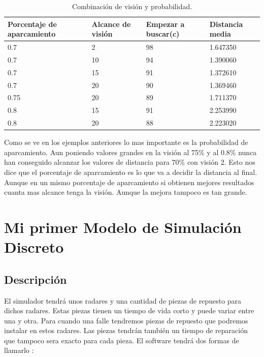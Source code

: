\documentclass[]{article}
\begin{document}
 \begin{table}[H]
	\begin{center}
		\resizebox{12.5cm}{!} {
			\begin{tabular}{|l|l|l|l|}
				\hline
				Porcentaje de aparcamiento & Alcance de visión & Empezar a buscar(c) & Distancia media \\
				\hline \hline
				0.7 & 2 & 98 & 1.647350
				\\ \hline
				0.7 & 10 & 94 & 1.390060
				\\ \hline
				0.7 & 15 & 91 & 1.372610
				\\ \hline
				0.7 & 20 & 90 & 1.369460
				\\ \hline
				0.75 & 20 & 89 & 1.711370
				\\ \hline
				0.8 & 15 & 91 & 2.253990	
				\\ \hline
				0.8 & 20 & 88&2.223020
				\\ \hline
			\end{tabular}
		}
		\caption{Combinación de visión y probabilidad.}
		\label{tabla:sencilla}
	\end{center}
\end{table}

Como se ve en los ejemplos anteriores lo mas importante es la probabilidad de aparcamiento. Aun poniendo valores grandes en la visión al 75\% y al 0.8\% nunca han conseguido alcanzar los valores de distancia para 70\% con visión 2. Esto nos dice que el porcentaje de aparcamiento es lo que va a decidir la distancia al final. Aunque en un mismo porcentaje de aparcamiento si obtienen mejores resultados cuanta mas alcance tenga la visión. Aunque la mejora tampoco es tan grande.

\section{Mi primer Modelo de Simulación Discreto}
\subsection{Descripción}
 
 El simulador tendrá unos radares y una cantidad de piezas de repuesto para dichos radares. Estas piezas tienen un tiempo de vida corto y puede variar entre una y otra. Para cuando una falle tendremos piezas de repuesto que podremos instalar en estos radares. Las piezas tendrán también un tiempo de reparación que tampoco sera exacto para cada pieza. El software tendrá dos formas de llamarlo :
 
\end{document}
